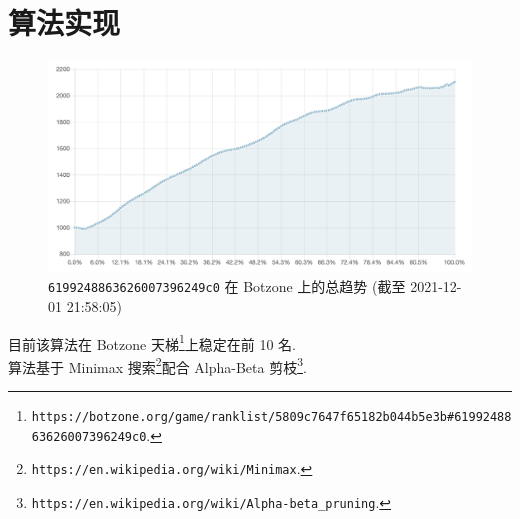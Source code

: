 \documentclass[12pt]{article}
\begin{document}
\newpage

\section{算法实现}

\begin{figure}[h]
    \centering
    \includegraphics[width=\textwidth]{rank}
    \caption{\texttt{6199248863626007396249c0} 在 Botzone 上的总趋势 (截至 2021-12-01 21:58:05)}
\end{figure}

\indent 目前该算法在 Botzone 天梯\footnote{\texttt{https://botzone.org/game/ranklist/5809c7647f65182b044b5e3b\#6199248863626007396249c0}.}上稳定在前 10 名. \\
\indent 算法基于 Minimax 搜索\footnote{\texttt{https://en.wikipedia.org/wiki/Minimax}.}配合 Alpha-Beta 剪枝\footnote{\texttt{https://en.wikipedia.org/wiki/Alpha-beta\_pruning}.}.
\end{document}
